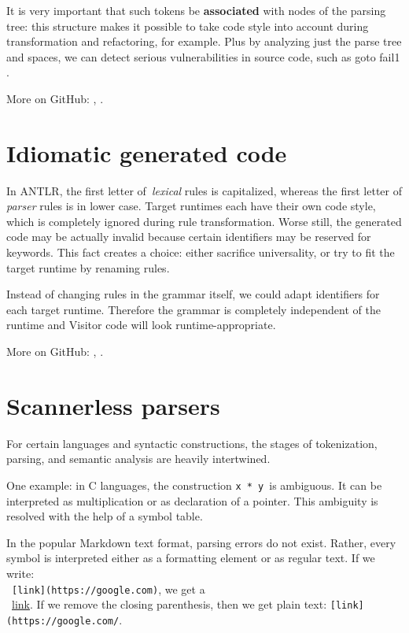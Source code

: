 \documentclass[sigplan,screen]{acmart}
\begin{document}
It is very important that such tokens be \textbf{associated} with nodes
of the parsing tree: this structure makes it possible to take code style
into account during transformation and refactoring, for example. Plus by
analyzing just the parse tree and spaces, we can detect serious
vulnerabilities in source code, such as goto fail1 \cite{goto-fail-vulnerability}.

More on GitHub: \cite{full-fidelity-tree-tokens}, \cite{error-tokens}.

\section{Idiomatic generated code}

In ANTLR, the first letter of~\emph{lexical} rules is capitalized,
whereas the first letter of \emph{parser} rules is in lower case. Target
runtimes each have their own code style, which is completely ignored
during rule transformation. Worse still, the generated code may be
actually invalid because certain identifiers may be reserved for
keywords. This fact creates a choice: either sacrifice universality, or try to
fit the target runtime by renaming rules.

Instead of changing rules in the grammar itself, we could adapt
identifiers for each target runtime. Therefore the grammar is completely
independent of the runtime and Visitor code will look
runtime-appropriate.

More on GitHub: \cite{naming-convention}, \cite{symbol-conflicts}.

\section{Scannerless parsers}

For certain languages and syntactic constructions, the stages of
tokenization, parsing, and semantic analysis are heavily intertwined.

One example: in C languages, the construction \texttt{x\ *\ y}~is
ambiguous. It can be interpreted as multiplication or as declaration of
a pointer. This ambiguity is resolved with the help of a symbol table.

In the popular Markdown text format, parsing errors do not exist. Rather, every
symbol is interpreted either as a formatting element or as regular text. If we
write: \\~\texttt{{[}link{]}(https://google.com)}, we get
a \\~\href{https://google.com/}{link}. If we remove the closing
parenthesis, then we get plain text:
\texttt{{[}link{]}(https://google.com/}.
\end{document}
